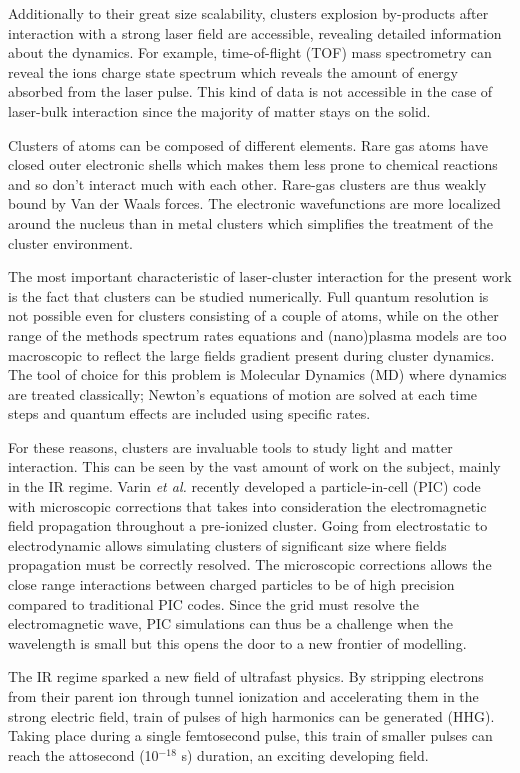 Additionally to their great size scalability, clusters explosion by-products
after interaction with a strong laser field are accessible, revealing detailed
information about the dynamics. For example, time-of-flight (TOF) mass
spectrometry can reveal the ions charge state spectrum which reveals the amount
of energy absorbed from the laser pulse. This kind of data is not accessible
in the case of laser-bulk interaction since the majority of matter stays on the
solid.

Clusters of atoms can be composed of different elements. Rare gas atoms have
closed outer electronic shells which makes them less prone to chemical
reactions and so don't interact much with each other. Rare-gas clusters are
thus weakly bound by Van der Waals forces. The electronic wavefunctions are
more localized around the nucleus than in metal clusters which simplifies the
treatment of the cluster environment.


The most important characteristic of laser-cluster interaction for the present
work is the fact that clusters can be studied numerically. Full quantum resolution
is not possible even for clusters consisting of a couple of atoms, while on the
other range of the methods spectrum rates equations and (nano)plasma models are
too macroscopic to reflect the large fields gradient present during cluster
dynamics\cite{Fennel2010}. The tool of choice for this problem is Molecular Dynamics
(MD) where dynamics are treated classically; Newton's equations of motion are
solved at each time steps and quantum effects are included using specific rates.

For these reasons, clusters are invaluable tools to study light and matter
interaction. This can be seen by the vast amount of work on the subject, mainly
in the IR regime\cite{Fennel2010}. Varin \textit{et al.}\cite{Varin2012} recently
developed a particle-in-cell (PIC) code with microscopic corrections that takes
into consideration the electromagnetic field propagation throughout a pre-ionized
cluster. Going from electrostatic to electrodynamic allows simulating clusters
of significant size where fields propagation must be correctly resolved. The
microscopic corrections allows the close range interactions between
charged particles to be of high precision compared to traditional PIC
codes\cite{Peltz2012}. Since the grid must resolve the electromagnetic wave,
PIC simulations can thus be a challenge when the wavelength is small but this
opens the door to a new frontier of modelling.

The IR regime sparked a new field of ultrafast physics. By stripping electrons
from their parent ion through tunnel ionization and accelerating them in the
strong electric field, train of pulses of high harmonics can be generated (HHG).
Taking place during a single femtosecond pulse, this train of smaller pulses
can reach the attosecond (10$^{-18}$ s) duration, an exciting developing field.

